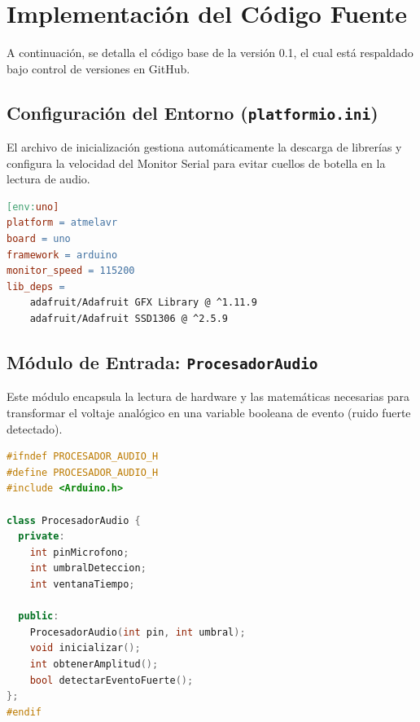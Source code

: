 \documentclass[10pt]{article}
\begin{document}
\newpage
\section{Implementación del Código Fuente}

A continuación, se detalla el código base de la versión 0.1, el cual está respaldado bajo control de versiones en GitHub.

\subsection{Configuración del Entorno (\texttt{platformio.ini})}
El archivo de inicialización gestiona automáticamente la descarga de librerías y configura la velocidad del Monitor Serial para evitar cuellos de botella en la lectura de audio.

\begin{lstlisting}[language=make, caption=Configuración en platformio.ini]
[env:uno]
platform = atmelavr
board = uno
framework = arduino
monitor_speed = 115200
lib_deps = 
	adafruit/Adafruit GFX Library @ ^1.11.9
	adafruit/Adafruit SSD1306 @ ^2.5.9
\end{lstlisting}

\subsection{Módulo de Entrada: \texttt{ProcesadorAudio}}
Este módulo encapsula la lectura de hardware y las matemáticas necesarias para transformar el voltaje analógico en una variable booleana de evento (ruido fuerte detectado).

\begin{lstlisting}[language=C++, caption=lib/ProcesadorAudio/ProcesadorAudio.h]
#ifndef PROCESADOR_AUDIO_H
#define PROCESADOR_AUDIO_H
#include <Arduino.h>

class ProcesadorAudio {
  private:
    int pinMicrofono;
    int umbralDeteccion;
    int ventanaTiempo;

  public:
    ProcesadorAudio(int pin, int umbral);
    void inicializar();
    int obtenerAmplitud();
    bool detectarEventoFuerte();
};
#endif
\end{lstlisting}
\end{document}
